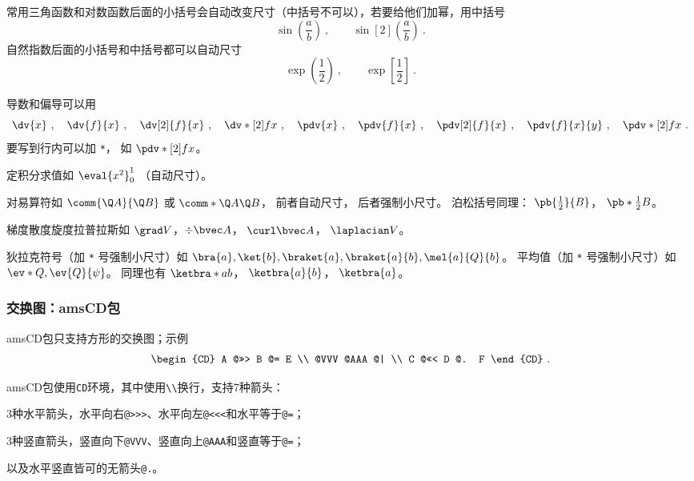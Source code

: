 常用三角函数和对数函数后面的小括号会自动改变尺寸（中括号不可以），若要给他们加幂，用中括号
\begin{equation}
\sin(\frac ab)~, \qquad \sin[2](\frac ab)~.
\end{equation}
自然指数后面的小括号和中括号都可以自动尺寸
\begin{equation}
\exp(\frac12)~, \qquad \exp[\frac12]~.
\end{equation}

导数和偏导可以用
\begin{equation}
\dv{x}~, \quad \dv{f}{x}~, \quad \dv[2]{f}{x}~, \quad \dv*[2]{f}{x}~, \quad
\pdv{x}~, \quad \pdv{f}{x}~, \quad \pdv[2]{f}{x}~, \quad \pdv{f}{x}{y}~, \quad \pdv*[2]{f}{x}~.
\end{equation}
要写到行内可以加 \verb|*|， 如 $\pdv*[2]{f}{x}$。

定积分求值如 $\eval{x^2}_0^1$ （自动尺寸）。

对易算符如 $\comm{\Q A}{\Q B}$ 或 $\comm*{\Q A}{\Q B}$， 前者自动尺寸， 后者强制小尺寸。 泊松括号同理： $\pb{\frac12}{B}$， $\pb*{\frac12}{B}$。

梯度散度旋度拉普拉斯如 $\grad V$，$\div\bvec A$， $\curl\bvec A$， $\laplacian V$。

狄拉克符号（加 \verb|*| 号强制小尺寸）如 $\bra{a}, \ket{b}, \braket{a}, \braket{a}{b}, \mel{a}{Q}{b}$。 平均值（加 \verb|*| 号强制小尺寸）如 $\ev*{Q}, \ev{Q}{\psi}$。 同理也有 $\ketbra*{a}{b}$， $\ketbra{a}{b}$， $\ketbra{a}$。

\subsubsection{交换图：amsCD包}

amsCD包只支持方形的交换图；示例
\begin{equation}
\begin{CD}
A @>>> B @= E \\
@VVV @AAA @| \\
C @<<< D @. F
\end{CD}~.
\end{equation}

amsCD包使用\verb|CD|环境，其中使用\verb|\\|换行，支持7种箭头：

3种水平箭头，水平向右\verb|@>>>|、水平向左\verb|@<<<|和水平等于\verb|@=|；

3种竖直箭头，竖直向下\verb|@VVV|、竖直向上\verb|@AAA|和竖直等于\verb|@=|；

以及水平竖直皆可的无箭头\verb|@.|。

